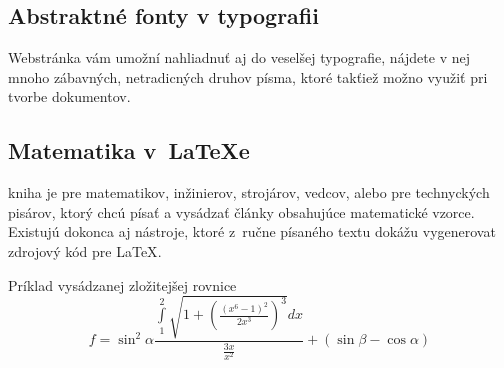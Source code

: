 \documentclass[a4paper, 11pt]{article}
\begin{document}
	\subsection{Abstraktné fonty v typografii}
	Webstránka \cite{Demaine2015} vám umožní nahliadnuť aj do veselšej  typografie, nájdete v nej mnoho zábavných, netradicných druhov písma, ktoré takťiež možno využiť pri tvorbe dokumentov.


	\subsection{Matematika v~{\LaTeX}e}
	kniha \cite{George1996} je pre matematikov, inžinierov, strojárov, vedcov, alebo pre technyckých pisárov, ktorý chcú písať a vysádzať články obsahujúce matematické vzorce. Existujú dokonca aj nástroje, ktoré z~ručne písaného textu dokážu vygenerovat zdrojový kód pre \LaTeX \cite{Oksuz2008}.
\par Príklad vysádzanej zložitejšej rovnice \cite{Bojko2011}
	$$
	f=
	\sin^2\alpha\frac{
	\int\limits_1^2
	\sqrt{1+\left(\frac{(x^6-1)^2}{2x^3}\right)^3}
	dx}
	{\frac{3x}{x^2}}+
	(\sin\beta - \cos\alpha)
	$$

	\newpage
	
	\renewcommand{\refname}{Literatura}
	
\end{document}
